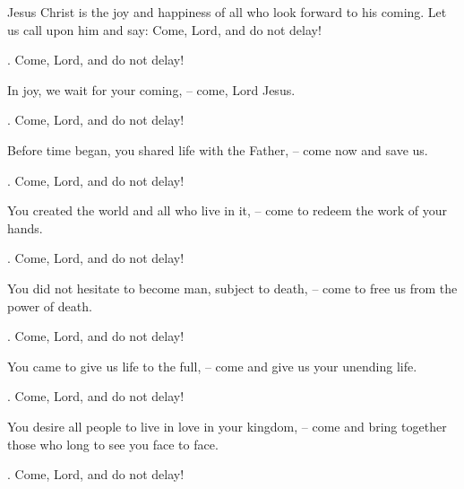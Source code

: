 \lettrine[loversize=0.15,lines=2]{J}{}esus Christ is the joy and happiness of all who look forward to his coming. Let us call upon him and say: Come, Lord, and do not delay!
\par \Rbar. Come, Lord, and do not delay!

In joy, we wait for your coming,
– come, Lord Jesus.
\par \Rbar. Come, Lord, and do not delay!

Before time began, you shared life with the Father,
– come now and save us.
\par \Rbar. Come, Lord, and do not delay!

You created the world and all who live in it,
– come to redeem the work of your hands.
\par \Rbar. Come, Lord, and do not delay!

You did not hesitate to become man, subject to death,
– come to free us from the power of death.
\par \Rbar. Come, Lord, and do not delay!

You came to give us life to the full,
– come and give us your unending life.
\par \Rbar. Come, Lord, and do not delay!

You desire all people to live in love in your kingdom,
– come and bring together those who long to see you face to face.
\par \Rbar. Come, Lord, and do not delay!